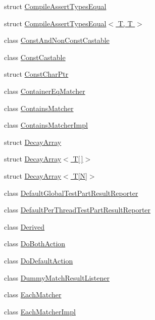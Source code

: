 \begin{DoxyCompactItemize}
struct \hyperlink{structtesting_1_1internal_1_1CompileAssertTypesEqual}{Compile\+Assert\+Types\+Equal}
\item 
struct \hyperlink{structtesting_1_1internal_1_1CompileAssertTypesEqual_3_01T_00_01T_01_4}{Compile\+Assert\+Types\+Equal$<$ T, T $>$}
\item 
class \hyperlink{classtesting_1_1internal_1_1ConstAndNonConstCastable}{Const\+And\+Non\+Const\+Castable}
\item 
class \hyperlink{classtesting_1_1internal_1_1ConstCastable}{Const\+Castable}
\item 
struct \hyperlink{structtesting_1_1internal_1_1ConstCharPtr}{Const\+Char\+Ptr}
\item 
class \hyperlink{classtesting_1_1internal_1_1ContainerEqMatcher}{Container\+Eq\+Matcher}
\item 
class \hyperlink{classtesting_1_1internal_1_1ContainsMatcher}{Contains\+Matcher}
\item 
class \hyperlink{classtesting_1_1internal_1_1ContainsMatcherImpl}{Contains\+Matcher\+Impl}
\item 
struct \hyperlink{structtesting_1_1internal_1_1DecayArray}{Decay\+Array}
\item 
struct \hyperlink{structtesting_1_1internal_1_1DecayArray_3_01T[]_4}{Decay\+Array$<$ T\mbox{[}$\,$\mbox{]}$>$}
\item 
struct \hyperlink{structtesting_1_1internal_1_1DecayArray_3_01T[N]_4}{Decay\+Array$<$ T\mbox{[}\+N\mbox{]}$>$}
\item 
class \hyperlink{classtesting_1_1internal_1_1DefaultGlobalTestPartResultReporter}{Default\+Global\+Test\+Part\+Result\+Reporter}
\item 
class \hyperlink{classtesting_1_1internal_1_1DefaultPerThreadTestPartResultReporter}{Default\+Per\+Thread\+Test\+Part\+Result\+Reporter}
\item 
class \hyperlink{classtesting_1_1internal_1_1Derived}{Derived}
\item 
class \hyperlink{classtesting_1_1internal_1_1DoBothAction}{Do\+Both\+Action}
\item 
class \hyperlink{classtesting_1_1internal_1_1DoDefaultAction}{Do\+Default\+Action}
\item 
class \hyperlink{classtesting_1_1internal_1_1DummyMatchResultListener}{Dummy\+Match\+Result\+Listener}
\item 
class \hyperlink{classtesting_1_1internal_1_1EachMatcher}{Each\+Matcher}
\item 
class \hyperlink{classtesting_1_1internal_1_1EachMatcherImpl}{Each\+Matcher\+Impl}

\end{DoxyCompactItemize}
